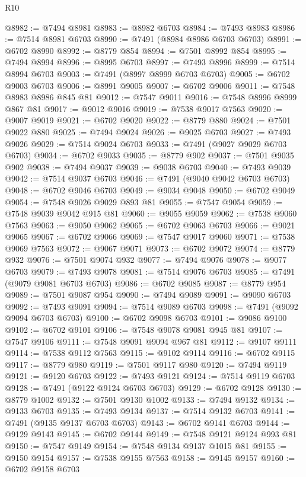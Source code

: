 \begin{lexlean}{R10}
\begin{coremodule}
@8982 := @7494 @8981
@8983 := @8982 @6703
@8984 := @7493 @8983
@8986 := @7514 @8981 @6703
@8990 := @7491 (@8984 @8986 @6703 @6703)
@8991 := @6702 @8990
@8992 := @8779 @854
@8994 := @7501 @8992 @854
@8995 := @7494 @8994
@8996 := @8995 @6703
@8997 := @7493 @8996
@8999 := @7514 @8994 @6703
@9003 := @7491 (@8997 @8999 @6703 @6703)
@9005 := @6702 @9003 @6703
@9006 := @8991 @9005
@9007 := @6702 @9006
@9011 := @7548 @8983 @8986 @845 @81
@9012 := @7547 @9011
@9016 := @7548 @8996 @8999 @867 @81
@9017 := @9012 @9016
@9019 := @7538 @9017 @7563
@9020 := @9007 @9019
@9021 := @6702 @9020
@9022 := @8779 @880
@9024 := @7501 @9022 @880
@9025 := @7494 @9024
@9026 := @9025 @6703
@9027 := @7493 @9026
@9029 := @7514 @9024 @6703
@9033 := @7491 (@9027 @9029 @6703 @6703)
@9034 := @6702 @9033
@9035 := @8779 @902
@9037 := @7501 @9035 @902
@9038 := @7494 @9037
@9039 := @9038 @6703
@9040 := @7493 @9039
@9042 := @7514 @9037 @6703
@9046 := @7491 (@9040 @9042 @6703 @6703)
@9048 := @6702 @9046 @6703
@9049 := @9034 @9048
@9050 := @6702 @9049
@9054 := @7548 @9026 @9029 @893 @81
@9055 := @7547 @9054
@9059 := @7548 @9039 @9042 @915 @81
@9060 := @9055 @9059
@9062 := @7538 @9060 @7563
@9063 := @9050 @9062
@9065 := @6702 @9063 @6703
@9066 := @9021 @9065
@9067 := @6702 @9066
@9069 := @7547 @9017 @9060
@9071 := @7538 @9069 @7563
@9072 := @9067 @9071
@9073 := @6702 @9072
@9074 := @8779 @932
@9076 := @7501 @9074 @932
@9077 := @7494 @9076
@9078 := @9077 @6703
@9079 := @7493 @9078
@9081 := @7514 @9076 @6703
@9085 := @7491 (@9079 @9081 @6703 @6703)
@9086 := @6702 @9085
@9087 := @8779 @954
@9089 := @7501 @9087 @954
@9090 := @7494 @9089
@9091 := @9090 @6703
@9092 := @7493 @9091
@9094 := @7514 @9089 @6703
@9098 := @7491 (@9092 @9094 @6703 @6703)
@9100 := @6702 @9098 @6703
@9101 := @9086 @9100
@9102 := @6702 @9101
@9106 := @7548 @9078 @9081 @945 @81
@9107 := @7547 @9106
@9111 := @7548 @9091 @9094 @967 @81
@9112 := @9107 @9111
@9114 := @7538 @9112 @7563
@9115 := @9102 @9114
@9116 := @6702 @9115
@9117 := @8779 @980
@9119 := @7501 @9117 @980
@9120 := @7494 @9119
@9121 := @9120 @6703
@9122 := @7493 @9121
@9124 := @7514 @9119 @6703
@9128 := @7491 (@9122 @9124 @6703 @6703)
@9129 := @6702 @9128
@9130 := @8779 @1002
@9132 := @7501 @9130 @1002
@9133 := @7494 @9132
@9134 := @9133 @6703
@9135 := @7493 @9134
@9137 := @7514 @9132 @6703
@9141 := @7491 (@9135 @9137 @6703 @6703)
@9143 := @6702 @9141 @6703
@9144 := @9129 @9143
@9145 := @6702 @9144
@9149 := @7548 @9121 @9124 @993 @81
@9150 := @7547 @9149
@9154 := @7548 @9134 @9137 @1015 @81
@9155 := @9150 @9154
@9157 := @7538 @9155 @7563
@9158 := @9145 @9157
@9160 := @6702 @9158 @6703

\end{coremodule}
\end{lexlean}
